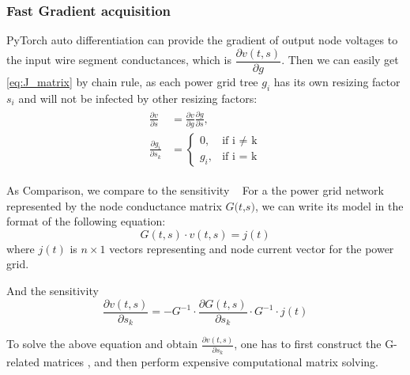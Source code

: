 \subsubsection{Fast Gradient acquisition}
PyTorch auto differentiation can provide the gradient of output node voltages to the input wire segment conductances, which is $ \dfrac{\partial v(t, s)}{\partial g}$. Then we can easily get \eqref{eq:J_matrix} by chain rule, as each power grid tree $g_{i}$ has its own resizing factor $s_{i}$ and will not be infected by other resizing factors:
\begin{equation}
	\label{eq:chain_rule}
	\begin{aligned}
	\begin{split}
	\frac{\partial v}{\partial s} & =\frac{\partial v}{\partial g} \frac{\partial g}{\partial s}, \\ 
	\frac{\partial g_{i}}{\partial s_{k}} & = 
    	\begin{cases}
        		0,      &\mbox{if i $\neq$ k} \\ 
        		g_{i},  &\mbox{if i = k} 
    	\end{cases}
	\end{split}
	\end{aligned}
\end{equation}



As Comparison, we compare to the sensitivity ~\cite{Sukharev:2019pg}
For a the power grid network represented by the node conductance matrix $ \textit{G(t,s)}$, we can write its model in the format of the following equation:
\begin{equation}
	\label{eq:gv=i}
	G(t,s)\cdot v(t,s)= j(t)
\end{equation}
where $j(t)$  is $n\times 1$ vectors representing and node current vector for the power grid.

And the sensitivity 
\begin{equation}
	\label{eq:dVs}
	\dfrac{\partial v(t,s)}{\partial s_{k}} = -G^{-1}\cdot \dfrac{\partial G(t,s)}{\partial s_{k}}  \cdot G^{-1}\cdot j(t)
\end{equation}




To solve the above equation and obtain $ \frac{\partial v(t,s)}{\partial s_{k}}$, one has to first construct the G-related matrices , and then perform expensive computational matrix solving. 


